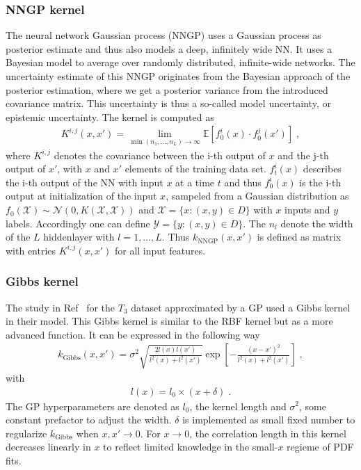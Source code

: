 \documentclass[11pt,a4paper]{article}
\begin{document}
\subsubsection*{NNGP kernel} %
The neural network Gaussian process (NNGP) uses a Gaussian process as posterior estimate and thus also models a deep, infinitely wide NN. It uses a Bayesian model to average over randomly distributed, infinite-wide networks.
The uncertainty estimate of this NNGP originates from the Bayesian approach of the posterior estimation, where we get a posterior variance from the introduced covariance matrix. This uncertainty is thus a so-called model uncertainty, or epistemic uncertainty.
The kernel is computed as 
%
\begin{align}
    K^{i,j} (x, x') = \lim_{\min{(n_1,...,n_L)} \rightarrow \infty} \mathbb{E} \left[ f_0^i (x) \cdot f_0^j(x') \right] \; ,
\end{align}
%
where $K^{i,j}$ denotes the covariance between the i-th output of $x$ and the j-th output of $x'$, with $x$ and $x'$ elements of the training data set. $f_t^i (x)$ describes the i-th output of the NN with input $x$ at a time $t$ and thus $f_0^i(x)$ is the i-th output at initialization of the input $x$, sampeled from a Gaussian distribution as $f_0(\mathcal{X}) \sim \mathcal{N}(0, K(\mathcal{X}, \mathcal{X}))$ and $\mathcal{X} = \{ x: (x,y) \in D\}$ with $x$ inputs and $y$ labels. Accordingly one can define $\mathcal{Y} = \{ y: (x,y) \in D\}$. The $n_l$ denote the width of the $L$ hiddenlayer with $l=1,...,L$. Thus $k_\text{NNGP} (x, x')$ is defined as matrix with entries $K^{i,j} (x, x')$ for all input features.

\subsubsection*{Gibbs kernel} %
The study in Ref~\cite{Candido:2024hjt} for the $T_3$ dataset approximated by a GP used a Gibbs kernel in their model.
This Gibbs kernel is similar to the RBF kernel but as a more advanced function. It can be expressed in the following way
%
\begin{align}
    k_\mathrm{Gibbs} (x, x') = \sigma^2 \sqrt{\frac{2l(x) l(x')}{l^2(x)+l^2(x')}} \exp \left[ - \frac{(x-x')^2}{l^2(x)+l^2(x')} \right] \; ,
    \label{eq:Gibbs}
\end{align}
with 
\begin{align}
    l(x) = l_0 \times (x+\delta) \; .
\end{align}
%
The GP hyperparameters are denoted as $l_0$, the kernel length and $\sigma^2$, some constant prefactor to adjust the width.
$\delta$ is implemented as small fixed number to regularize $k_\mathrm{Gibbs}$ when $x, x' \rightarrow 0$. For $x\rightarrow 0$, the correlation length in this kernel decreases linearly in $x$ to reflect limited knowledge in the small-$x$ regieme of PDF fits.
\end{document}
